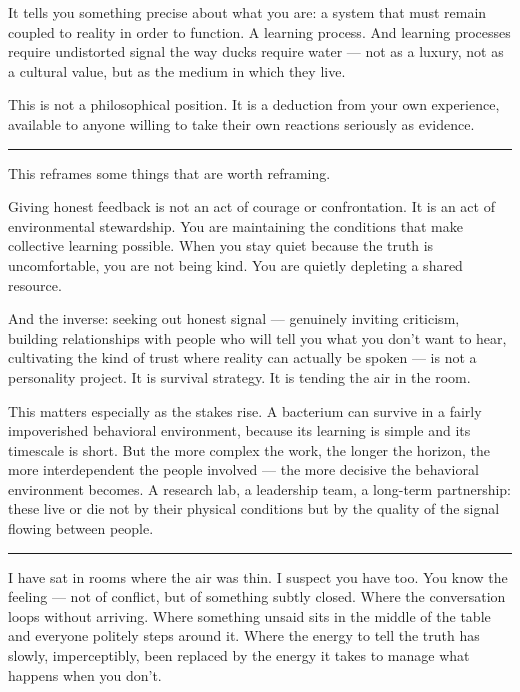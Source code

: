 \documentclass[12pt,letterpaper]{article}
\begin{document}
It tells you something precise about what you are: a system that must remain coupled to reality in order to function. A learning process. And learning processes require undistorted signal the way ducks require water — not as a luxury, not as a cultural value, but as the medium in which they live.

This is not a philosophical position. It is a deduction from your own experience, available to anyone willing to take their own reactions seriously as evidence.

\begin{center}
\rule{\textwidth}{0.4pt}
\end{center}

This reframes some things that are worth reframing.

Giving honest feedback is not an act of courage or confrontation. It is an act of environmental stewardship. You are maintaining the conditions that make collective learning possible. When you stay quiet because the truth is uncomfortable, you are not being kind. You are quietly depleting a shared resource.

And the inverse: seeking out honest signal — genuinely inviting criticism, building relationships with people who will tell you what you don't want to hear, cultivating the kind of trust where reality can actually be spoken — is not a personality project. It is survival strategy. It is tending the air in the room.

This matters especially as the stakes rise. A bacterium can survive in a fairly impoverished behavioral environment, because its learning is simple and its timescale is short. But the more complex the work, the longer the horizon, the more interdependent the people involved — the more decisive the behavioral environment becomes. A research lab, a leadership team, a long-term partnership: these live or die not by their physical conditions but by the quality of the signal flowing between people.

\begin{center}
\rule{\textwidth}{0.4pt}
\end{center}

I have sat in rooms where the air was thin. I suspect you have too. You know the feeling — not of conflict, but of something subtly closed. Where the conversation loops without arriving. Where something unsaid sits in the middle of the table and everyone politely steps around it. Where the energy to tell the truth has slowly, imperceptibly, been replaced by the energy it takes to manage what happens when you don't.
\end{document}
